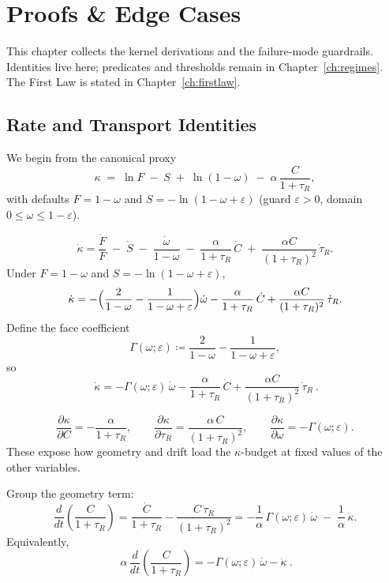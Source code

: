 \chapter{Proofs \& Edge Cases}
\label{ch:proofs}

This chapter collects the kernel derivations and the failure-mode guardrails. Identities live here; predicates and thresholds remain in Chapter~\ref{ch:regimes}. The First Law is stated in Chapter~\ref{ch:firstlaw}.

\section{Rate and Transport Identities}
We begin from the canonical proxy
\[
\kappa \;=\; \ln F \;-\; S \;+\; \ln(1-\omega) \;-\; \alpha\,\frac{C}{1+\tau_{R}},
\]
with defaults \(F=1-\omega\) and \(S=-\ln(1-\omega+\varepsilon)\) (guard \(\varepsilon>0\), domain \(0\le\omega\le 1-\varepsilon\)).

\begin{eqbox}
\[
\dot{\kappa}
= \frac{\dot{F}}{F} \;-\; \dot{S} \;-\; \frac{\dot{\omega}}{1-\omega}
  \;-\; \frac{\alpha}{1+\tau_{R}}\,\dot{C}
  \;+\; \frac{\alpha C}{(1+\tau_{R})^{2}}\,\dot{\tau}_{R}.
\]
Under \(F=1-\omega\) and \(S=-\ln(1-\omega+\varepsilon)\),
\[
\dot{\kappa}
= -\Bigl(\frac{2}{1-\omega} - \frac{1}{1-\omega+\varepsilon}\Bigr)\dot{\omega}
  - \frac{\alpha}{1+\tau_{R}}\,\dot{C}
  + \frac{\alpha C}{(1+\tau_{R})^{2}}\,\dot{\tau}_{R}.
\]
Define the face coefficient
\[
\Gamma(\omega;\varepsilon)\coloneqq \frac{2}{1-\omega} - \frac{1}{1-\omega+\varepsilon},
\]
so
\[
\boxed{\ \dot{\kappa} = -\Gamma(\omega;\varepsilon)\,\dot{\omega}
              - \frac{\alpha}{1+\tau_{R}}\,\dot{C}
              + \frac{\alpha C}{(1+\tau_{R})^{2}}\,\dot{\tau}_{R}\ }.
\]
\end{eqbox}

\begin{eqbox}
\[
\frac{\partial \kappa}{\partial C} = -\frac{\alpha}{1+\tau_{R}},
\qquad
\frac{\partial \kappa}{\partial \tau_{R}} = \frac{\alpha\,C}{(1+\tau_{R})^{2}},
\qquad
\frac{\partial \kappa}{\partial \omega} = -\Gamma(\omega;\varepsilon).
\]
These expose how geometry and drift load the \(\kappa\)-budget at fixed values of the other variables.
\end{eqbox}

\begin{eqbox}
Group the geometry term:
\[
\frac{d}{dt}\!\left(\frac{C}{1+\tau_{R}}\right)
= \frac{\dot{C}}{1+\tau_{R}} - \frac{C\,\dot{\tau}_{R}}{(1+\tau_{R})^{2}}
= -\frac{1}{\alpha}\,\Gamma(\omega;\varepsilon)\,\dot{\omega}
  \;-\; \frac{1}{\alpha}\,\dot{\kappa}.
\]
Equivalently,
\[
\boxed{\ \alpha\,\frac{d}{dt}\!\left(\frac{C}{1+\tau_{R}}\right)
= -\Gamma(\omega;\varepsilon)\,\dot{\omega} - \dot{\kappa}\ }.
\]
\end{eqbox}

